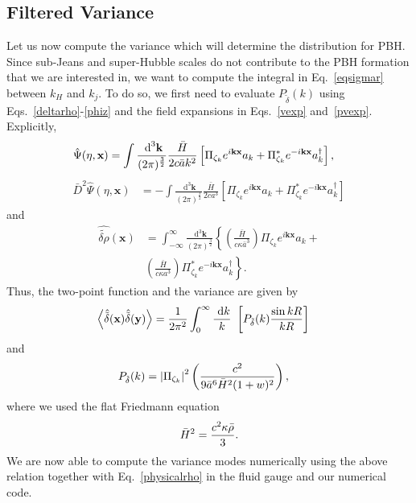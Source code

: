 \documentclass[a4paper,11pt]{article}
\begin{document}
\subsection{Filtered Variance}	
Let us now compute the variance which will determine the distribution for PBH. Since sub-Jeans and super-Hubble scales do not contribute to the PBH formation that we are interested in, we want to compute the integral in  Eq.~\eqref{eqsigmar} between $k_H$ and $k_j$. To do so, we first need to evaluate $P_{\tilde{\delta}}(k)$ using Eqs.~\eqref{deltarho}-\eqref{phiz} and the field expansions in Eqs.~\eqref{vexp} and~\eqref{pvexp}. Explicitly,
 \begin{align}
	\label{psiq}
	\hat{\Psi}(\eta,\textbf{x})&=\int\frac{\mathrm{~d}^3\textbf{k}}	{(2\pi)^{\frac{3}{2}}} \frac{\bar{H}}{2c \Bar{a}  k^2}\left[\Pi_{\zeta_{k}} e^{i\textbf{k}\textbf{x}} a_{k} + \Pi_{\zeta_{k}}^{ *}e^{-i\textbf{k}\textbf{x}} a_{k}^{\dagger}\right]
	,\end{align}
	\begin{align}
	\bar{D}^2\hat{\Psi}(\eta,\textbf{x})&=-\int\frac{\mathrm{~d}^3\textbf{k}}	{(2\pi)^{\frac{3}{2}}} \frac{\bar{H}}{2c a^3 }\left[\Pi_{\zeta_{k}} e^{i\textbf{k}\textbf{x}} a_{k} + \Pi_{\zeta_{k}}^{*}e^{-i\textbf{k}\textbf{x}} a_{k}^{\dagger}\right]
	\end{align}
and
\begin{align}
	\hat{\tilde{\delta\rho}}(\textbf{x})&= \int_{-\infty}^{\infty}\frac{\mathrm{~d}^3\textbf{k}}	{(2\pi)^{\frac{3}{2}}} \left\{ \left(\frac{\bar{H}}{c\kappa \bar{a}^3}\right)\Pi_{\zeta_{k}} e^{i\textbf{k}\textbf{x}} a_{k} +\right. \nonumber \\
	&\left. \left(\frac{\bar{H}}{c\kappa a^3}\right)\Pi_{\zeta_{k}}^{*} e^{-i\textbf{k}\textbf{x}} a_{k}^{\dagger}\right\}
	.\end{align}
 Thus, the two-point function and the variance are given by
	\begin{align}
 \label{2point}
\left<\hat{\Tilde{\delta}}(\textbf{x})\hat{\Tilde{\delta}}(\textbf{y})\right>&=\frac{1}{2\pi^2} \int_0^\infty \frac{\mathrm{~d}k}{k}~\left[P_{\tilde{\delta}}(k) \frac{\sin{kR}}{kR} \right] 
\end{align}	
and
\begin{align}
P_{\tilde{\delta}}(k)&= \abs{\Pi_{\zeta_{k}}}^2\left( \frac{c^2}{9\bar{a}^6 \Bar{H}^2(1+w)^2}\right) 
,\end{align}
where we used the flat Friedmann equation
\begin{align}
    \bar{H}^2 = \frac{c^2\kappa \Bar{\rho}}{3}
.\end{align}
We are now able to compute the variance modes numerically using the above relation together with Eq.~\eqref{physicalrho} in the fluid gauge and our numerical code.  
\end{document}
